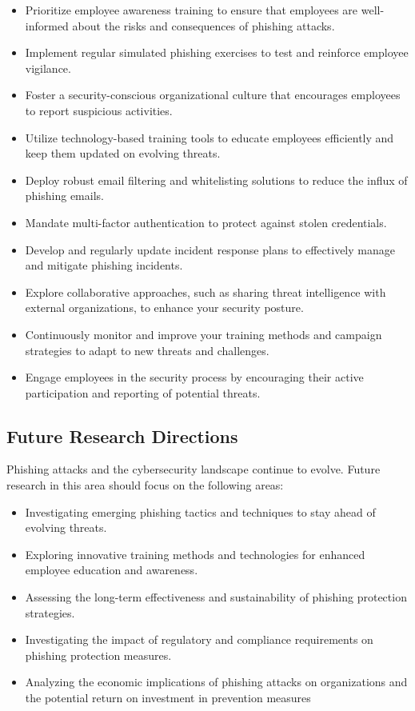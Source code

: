 \documentclass[conference]{IEEEtran}
\begin{document}
\begin{itemize}
    \item Prioritize employee awareness training to ensure that employees are well-informed about the risks and consequences of phishing attacks.
\item  Implement regular simulated phishing exercises to test and reinforce employee vigilance.
\item  Foster a security-conscious organizational culture that encourages employees to report suspicious activities.
\item  Utilize technology-based training tools to educate employees efficiently and keep them updated on evolving threats.
\item  Deploy robust email filtering and whitelisting solutions to reduce the influx of phishing emails.
\item  Mandate multi-factor authentication to protect against stolen credentials.
\item  Develop and regularly update incident response plans to effectively manage and mitigate phishing incidents.
\item  Explore collaborative approaches, such as sharing threat intelligence with external organizations, to enhance your security posture.
\item  Continuously monitor and improve your training methods and campaign strategies to adapt to new threats and challenges.
\item  Engage employees in the security process by encouraging their active participation and reporting of potential threats.
\end{itemize}

\subsection{Future Research Directions}
Phishing attacks and the cybersecurity landscape continue to evolve. Future research in this area should focus on the following areas:

\begin{itemize}
    \item Investigating emerging phishing tactics and techniques to stay ahead of evolving threats.
\item  Exploring innovative training methods and technologies for enhanced employee education and awareness.
\item Assessing the long-term effectiveness and sustainability of phishing protection strategies.
\item  Investigating the impact of regulatory and compliance requirements on phishing protection measures.
\item  Analyzing the economic implications of phishing attacks on organizations and the potential return on investment in prevention measures
\end{itemize}
\end{document}

